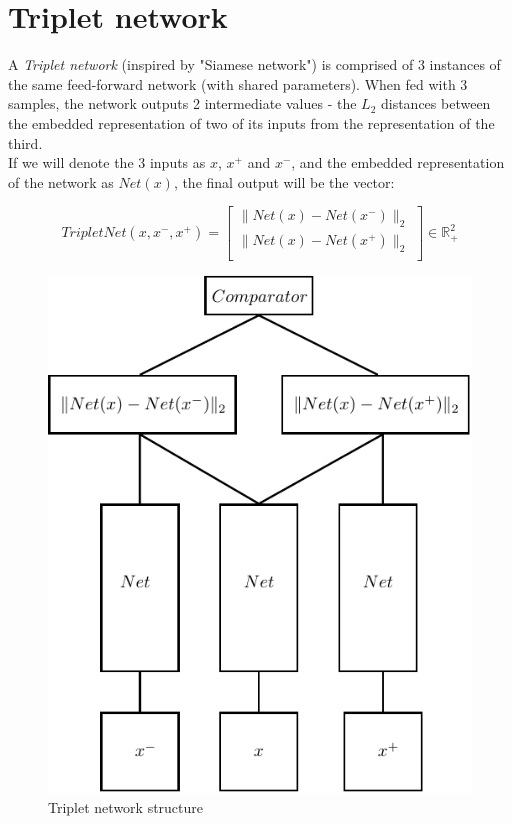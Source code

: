 \documentclass{article} %
\begin{document}
\section{Triplet network}
A \emph{Triplet network} (inspired by "Siamese network") is comprised of 3 instances of the same feed-forward network (with shared parameters).
When fed with 3 samples, the network
outputs 2 intermediate values - the $L_2$ distances between the embedded representation of two of its inputs from the representation of the third. \\
If we will denote the 3 inputs as $x$, $x^{+}$ and $x^{-}$, and the
embedded representation of the network as $Net(x)$, the final output will be the vector:

\begin{equation*}
    TripletNet(x,x^{-},x^{+})= \begin{bmatrix}
                       \|Net(x)-Net(x^{-})\|_2 \\[0.3em]
                      \|Net(x)-Net(x^{+})\|_2 \\

                      \end{bmatrix} \in \mathbb{R}_{+}^2
\end{equation*}

\begin{figure}[h]
\begin{center}
\includegraphics[width=0.5\linewidth]{TripletNet_scheme.pdf}
\end{center}
   \caption{Triplet network structure }\label{tripletnet_scheme}
\end{figure}
\end{document}
